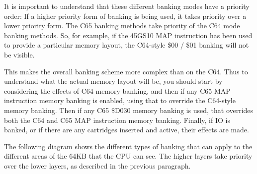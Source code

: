 It is important to understand that these different banking modes have
a priority order: If a higher priority form of banking is being used,
it takes priority over a lower priority form.  The C65 banking methods
take priority of the C64 mode banking methods.  So, for example, if
the 45GS10 MAP instruction has been used to provide a particular
memory layout, the C64-style \$00 / \$01 banking will not be visible.

This makes the overall banking scheme more complex than on the C64.
Thus to understand what the actual memory layout will be, you should
start by considering the effects of C64 memory banking, and then if
any C65 MAP instruction memory banking is enabled, using that to override the
C64-style memory banking. Then if any C65 \$D030 memory banking is
used, that overrides both the C64 and C65 MAP instruction memory
banking. Finally, if IO is banked, or if there are any cartridges
inserted and active, their effects are made.

The following diagram shows the different types of banking that can
apply to the different areas of the 64KB that the CPU can see.  The
higher layers take priority over the lower layers, as described in the
previous paragraph.

